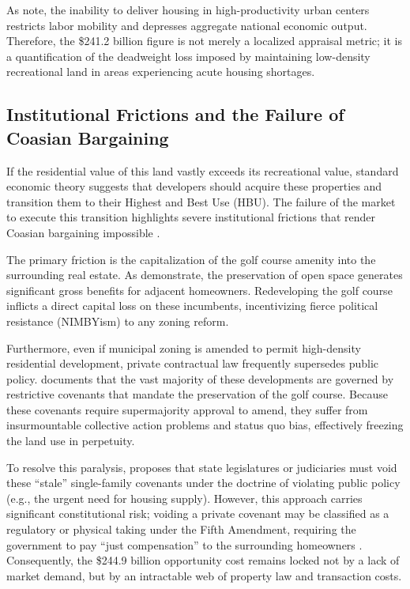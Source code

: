 \documentclass[10pt, letterpaper]{article}
\begin{document}
As \textcite{Glaeser2017} note, the inability to deliver housing in high-productivity urban centers restricts labor mobility and depresses aggregate national economic output. Therefore, the \$241.2 billion figure is not merely a localized appraisal metric; it is a quantification of the deadweight loss imposed by maintaining low-density recreational land in areas experiencing acute housing shortages.

\subsection{Institutional Frictions and the Failure of Coasian Bargaining}
If the residential value of this land vastly exceeds its recreational value, standard economic theory suggests that developers should acquire these properties and transition them to their Highest and Best Use (HBU). The failure of the market to execute this transition highlights severe institutional frictions that render Coasian bargaining impossible \parencite{Coase1960}.

The primary friction is the capitalization of the golf course amenity into the surrounding real estate. As \textcite{Cheshire2002} demonstrate, the preservation of open space generates significant gross benefits for adjacent homeowners. Redeveloping the golf course inflicts a direct capital loss on these incumbents, incentivizing fierce political resistance (NIMBYism) to any zoning reform.

Furthermore, even if municipal zoning is amended to permit high-density residential development, private contractual law frequently supersedes public policy. \textcite{Ellickson2022} documents that the vast majority of these developments are governed by restrictive covenants that mandate the preservation of the golf course. Because these covenants require supermajority approval to amend, they suffer from insurmountable collective action problems and status quo bias, effectively freezing the land use in perpetuity. 

To resolve this paralysis, \textcite{Korngold2024} proposes that state legislatures or judiciaries must void these ``stale'' single-family covenants under the doctrine of violating public policy (e.g., the urgent need for housing supply). However, this approach carries significant constitutional risk; voiding a private covenant may be classified as a regulatory or physical taking under the Fifth Amendment, requiring the government to pay ``just compensation'' to the surrounding homeowners \parencite{Korngold2024}. Consequently, the \$244.9 billion opportunity cost remains locked not by a lack of market demand, but by an intractable web of property law and transaction costs.
\end{document}
